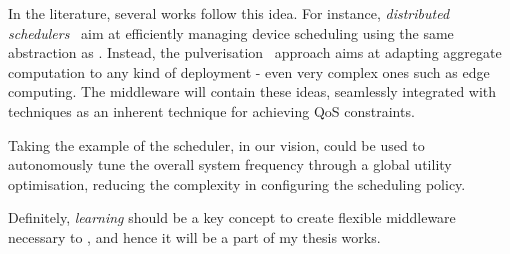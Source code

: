 \documentclass[11pt]{article}
\begin{document}
In the \ac{} literature, several works follow this idea. 
%
For instance, \emph{distributed schedulers}~\cite{DBLP:journals/corr/abs-2012-13806} aim at efficiently managing device scheduling using the same abstraction as \ac{}.
Instead, the pulverisation~\cite{DBLP:journals/fi/CasadeiPPVW20} approach aims at adapting aggregate computation to any kind of deployment - even very complex ones such as edge computing.
%
The middleware will contain these ideas, seamlessly integrated with \rl{} techniques as an inherent technique for achieving  QoS constraints.

Taking the example of the scheduler, in our vision, \rl{} could be used to autonomously tune the overall system frequency through a global utility optimisation, reducing the complexity in configuring the scheduling policy.

Definitely, \emph{learning} should be a key concept to create flexible middleware necessary to \cpsw{}, and hence it will be a part of my thesis works. 



\end{document}
